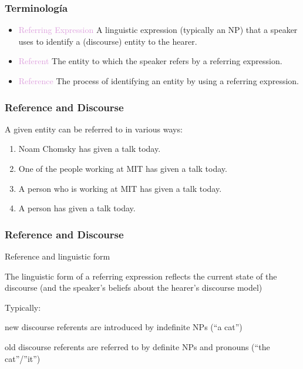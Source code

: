 \documentclass[compress,color=usenames]{beamer}
\newcommand{\mH}[1]{\textcolor{Plum}{#1}}
\begin{document}
\begin{frame}
\frametitle{Terminolog\'ia}

\begin{itemize}
\item \mH{Referring Expression}
A linguistic expression (typically an NP) that a speaker uses to
identify a (discourse) entity to the hearer.

\item \mH{Referent}
The entity to which the speaker refers by a referring expression.

\item \mH{Reference}
The process of identifying an entity by using a referring expression.

\end{itemize}
\end{frame}


\begin{frame}
\frametitle{Reference and Discourse}

A given entity can be referred to in various ways:

\begin{enumerate}
\item 
Noam Chomsky has given a talk today.

\item
One of the people working at MIT has given a talk today.

\item 
A person who is working at MIT has given a talk today.

\item 
A person has given a talk today.
\end{enumerate}
\end{frame}

\begin{frame}
\frametitle{Reference and Discourse}

Reference and linguistic form

The linguistic form of a referring expression reﬂects the current
state of the discourse (and the speaker's beliefs about the hearer's
discourse model)\pause

Typically:

new discourse referents are introduced by indeﬁnite NPs ({``}a
cat'')

old discourse referents are referred to by deﬁnite NPs and
pronouns ({``}the cat''/''it'')

\end{frame}
\end{document}
